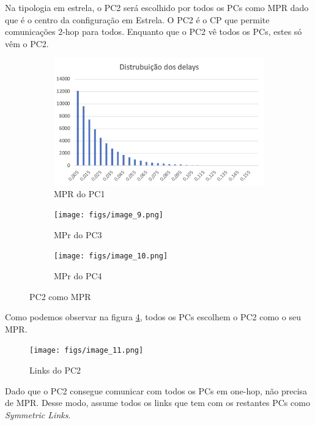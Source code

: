 Na tipologia em estrela, o PC2 será escolhido por todos os PCs como MPR dado que é o centro da configuração em Estrela.
O PC2 é o CP que permite comunicações 2-hop para todos.
Enquanto que o PC2 vê todos os PCs, estes só vêm o PC2.

\begin{figure}[H]
    \centering
    \begin{subfigure}{.33\textwidth}
        \centering
        \includegraphics[width=.95\linewidth]{figs/image_8.png}
        \caption{MPR do PC1}
        \label{fig:6_1}
    \end{subfigure}%
    \begin{subfigure}{.33\textwidth}
        \centering
        \texttt{[image: figs/image\_9.png]}
        \caption{MPr do PC3}
        \label{fig:6_2}
    \end{subfigure}
    \begin{subfigure}{.33\textwidth}
        \centering
        \texttt{[image: figs/image\_10.png]}
        \caption{MPr do PC4}
        \label{fig:6_}
    \end{subfigure}
    \caption{PC2 como MPR}
    \label{fig:6}
\end{figure}

Como podemos observar na figura \ref{fig:6}, todos os PCs escolhem o PC2 como o seu MPR.

\begin{figure}[H]
    \centering
    \texttt{[image: figs/image\_11.png]}
    \caption{Links do PC2}
    \label{fig:7}
\end{figure}

Dado que o PC2 consegue comunicar com todos os PCs em one-hop, não precisa de MPR.
Desse modo, assume todos os links que tem com os restantes PCs como \textit{Symmetric Links}.



